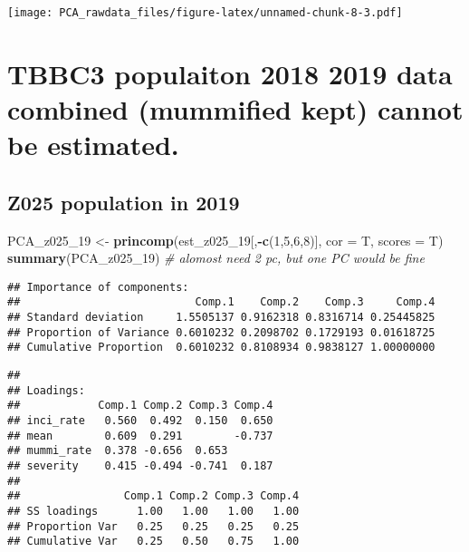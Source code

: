 \documentclass[]{article}
\newenvironment{Shaded}{\begin{snugshade}}{\end{snugshade}}
\newcommand{\CommentTok}[1]{\textcolor[rgb]{0.56,0.35,0.01}{\textit{#1}}}
\newcommand{\DataTypeTok}[1]{\textcolor[rgb]{0.13,0.29,0.53}{#1}}
\newcommand{\DecValTok}[1]{\textcolor[rgb]{0.00,0.00,0.81}{#1}}
\newcommand{\KeywordTok}[1]{\textcolor[rgb]{0.13,0.29,0.53}{\textbf{#1}}}
\newcommand{\NormalTok}[1]{#1}
\newcommand{\OperatorTok}[1]{\textcolor[rgb]{0.81,0.36,0.00}{\textbf{#1}}}
\newcommand{\StringTok}[1]{\textcolor[rgb]{0.31,0.60,0.02}{#1}}
\begin{document}
\texttt{[image: PCA\_rawdata\_files/figure-latex/unnamed-chunk-8-3.pdf]}

\hypertarget{tbbc3-populaiton-2018-2019-data-combined-mummified-kept-cannot-be-estimated.}{%
\section{TBBC3 populaiton 2018 2019 data combined (mummified kept)
cannot be
estimated.}\label{tbbc3-populaiton-2018-2019-data-combined-mummified-kept-cannot-be-estimated.}}

\hypertarget{z025-population-in-2019}{%
\subsection{Z025 population in 2019}\label{z025-population-in-2019}}

\begin{Shaded}
\begin{Highlighting}[]
\NormalTok{PCA_z025_}\DecValTok{19}\NormalTok{ <-}\StringTok{ }\KeywordTok{princomp}\NormalTok{(est_z025_}\DecValTok{19}\NormalTok{[,}\OperatorTok{-}\KeywordTok{c}\NormalTok{(}\DecValTok{1}\NormalTok{,}\DecValTok{5}\NormalTok{,}\DecValTok{6}\NormalTok{,}\DecValTok{8}\NormalTok{)], }\DataTypeTok{cor =}\NormalTok{ T, }\DataTypeTok{scores =}\NormalTok{ T)}
\KeywordTok{summary}\NormalTok{(PCA_z025_}\DecValTok{19}\NormalTok{) }\CommentTok{# alomost need 2 pc, but one PC would be fine}
\end{Highlighting}
\end{Shaded}

\begin{verbatim}
## Importance of components:
##                           Comp.1    Comp.2    Comp.3     Comp.4
## Standard deviation     1.5505137 0.9162318 0.8316714 0.25445825
## Proportion of Variance 0.6010232 0.2098702 0.1729193 0.01618725
## Cumulative Proportion  0.6010232 0.8108934 0.9838127 1.00000000
\end{verbatim}

\begin{Shaded}
\end{Shaded}

\begin{verbatim}
## 
## Loadings:
##            Comp.1 Comp.2 Comp.3 Comp.4
## inci_rate   0.560  0.492  0.150  0.650
## mean        0.609  0.291        -0.737
## mummi_rate  0.378 -0.656  0.653       
## severity    0.415 -0.494 -0.741  0.187
## 
##                Comp.1 Comp.2 Comp.3 Comp.4
## SS loadings      1.00   1.00   1.00   1.00
## Proportion Var   0.25   0.25   0.25   0.25
## Cumulative Var   0.25   0.50   0.75   1.00
\end{verbatim}
\end{document}
